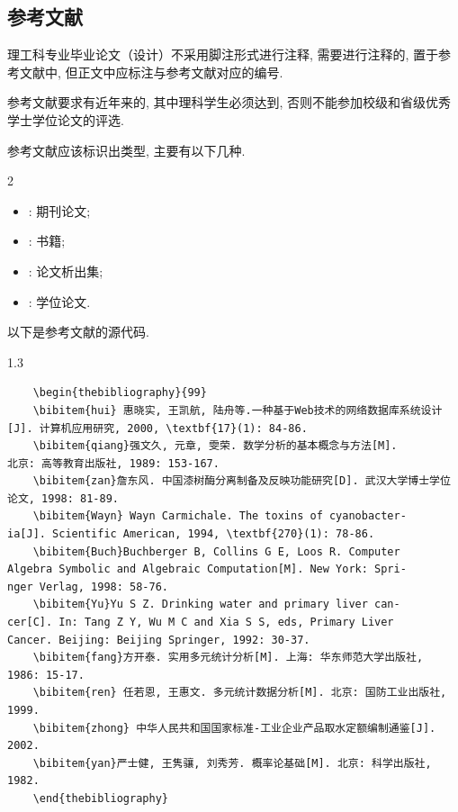 \documentclass[a4paper,12pt,twoside]{ctexart}
\begin{document}
    \noindent
{}

    \subsection{参考文献}
    理工科专业毕业论文（设计）不采用脚注形式进行注释, 需要进行注释的, 置于参考文献中, 但正文中应标注与参考文献对应的编号.

    参考文献要求有近年来的, 其中理科学生必须达到\textbf{}, 否则不能参加校级和省级优秀学士学位论文的评选.

    参考文献应该标识出类型, 主要有以下几种.\vspace*{-10pt}
    \begin{multicols}{2}
    \begin{itemize}
      \item [J]: 期刊论文;
      \item [M]: 书籍;
      \item [C]: 论文析出集;
      \item [D]: 学位论文.
    \end{itemize}
    \end{multicols}
    以下是参考文献的源代码.\vspace*{-10pt}
    \begin{spacing}{1.3}
    \begin{verbatim}
    \begin{thebibliography}{99}
    \bibitem{hui} 惠晓实, 王凯航, 陆舟等.一种基于Web技术的网络数据库系统设计[J]. 计算机应用研究, 2000, \textbf{17}(1): 84-86.
    \bibitem{qiang}强文久, 元章, 雯荣. 数学分析的基本概念与方法[M].
北京: 高等教育出版社, 1989: 153-167.
    \bibitem{zan}詹东风. 中国漆树酶分离制备及反映功能研究[D]. 武汉大学博士学位论文, 1998: 81-89.
    \bibitem{Wayn} Wayn Carmichale. The toxins of cyanobacter-
ia[J]. Scientific American, 1994, \textbf{270}(1): 78-86.
    \bibitem{Buch}Buchberger B, Collins G E, Loos R. Computer
Algebra Symbolic and Algebraic Computation[M]. New York: Spri-
nger Verlag, 1998: 58-76.
    \bibitem{Yu}Yu S Z. Drinking water and primary liver can-
cer[C]. In: Tang Z Y, Wu M C and Xia S S, eds, Primary Liver
Cancer. Beijing: Beijing Springer, 1992: 30-37.
    \bibitem{fang}方开泰. 实用多元统计分析[M]. 上海: 华东师范大学出版社, 1986: 15-17.
    \bibitem{ren} 任若恩, 王惠文. 多元统计数据分析[M]. 北京: 国防工业出版社, 1999.
    \bibitem{zhong} 中华人民共和国国家标准-工业企业产品取水定额编制通鉴[J]. 2002.
    \bibitem{yan}严士健, 王隽骧, 刘秀芳. 概率论基础[M]. 北京: 科学出版社, 1982.
    \end{thebibliography}
    \end{verbatim}
    \end{spacing}\vspace*{0pt}
\end{document}
